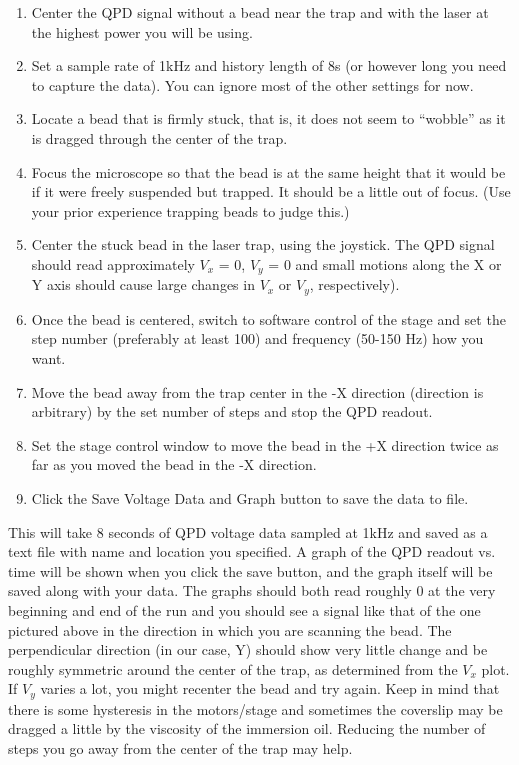 \documentclass{../lab}
\begin{document}
\begin{enumerate}
    \item Center the QPD signal without a bead near the trap and with the laser at the highest power you will be using.

    \item Set a sample rate of 1kHz and history length of 8s (or however long you need to capture the data). You can ignore most of the other settings for now.

    \item Locate a bead that is firmly stuck, that is, it does not seem to ``wobble'' as it is dragged through the center of the trap.

    \item Focus the microscope so that the bead is at the same height that it would be if it were freely suspended but trapped. It should be a little out of focus. (Use your prior experience trapping beads to judge this.)

    \item Center the stuck bead in the laser trap, using the joystick. The QPD signal should read approximately $V_x$ = 0, $V_y$ = 0 and small motions along the X or Y axis should cause large changes in $V_x$ or $V_y$, respectively).

    \item Once the bead is centered, switch to software control of the stage and set the step number (preferably at least 100) and frequency (50-150 Hz) how you want.

    \item Move the bead away from the trap center in the -X direction (direction is arbitrary) by the set number of steps and stop the QPD readout.

    \item Set the stage control window to move the bead in the +X direction twice as far as you moved the bead in the -X direction.

    \item Click the Save Voltage Data and Graph button to save the data to file.

\end{enumerate}

This will take 8 seconds of QPD voltage data sampled at 1kHz and saved as a text file with name and location you specified. A graph of the QPD readout vs. time will be shown when you click the save button, and the graph itself will be saved along with your data. The graphs should both read roughly 0 at the very beginning and end of the run and you should see a signal like that of the one pictured above in the direction in which you are scanning the bead. The perpendicular direction (in our case, Y) should show very little change and be roughly symmetric around the center of the trap, as determined from the $V_x$ plot. If $V_y$ varies a lot, you might recenter the bead and try again. Keep in mind that there is some hysteresis in the motors/stage and sometimes the coverslip may be dragged a little by the viscosity of the immersion oil. Reducing the number of steps you go away from the center of the trap may help.
\end{document}
